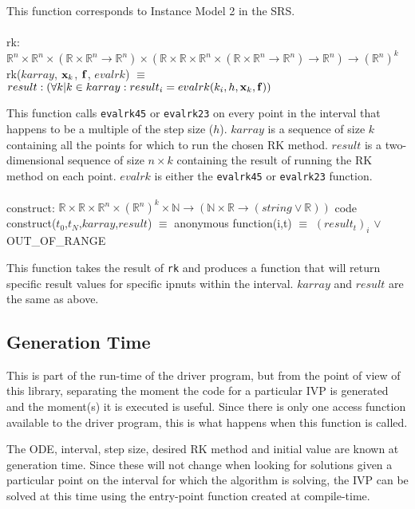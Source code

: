 \documentclass[12pt, titlepage]{article}
\begin{document}
This function corresponds to Instance Model 2 in the SRS.\\
\\
rk: $\mathbb{R}^n \times \mathbb{R}^n \times 
(\mathbb{R} \times \mathbb{R}^n \rightarrow \mathbb{R}^n) \times
(\mathbb{R} \times \mathbb{R} \times \mathbb{R}^n \times (\mathbb{R} 
\times \mathbb{R}^n \rightarrow \mathbb{R}^n) \rightarrow \mathbb{R}^n) 
\rightarrow (\mathbb{R}^n)^k$\\
rk($karray$, ${\bf x}_k$, ${\bf f}$, $evalrk$) $\equiv$ $result : (\forall k | 
k 
\in karray : result_i = evalrk (k_i,h, {\bf x}_k, {\bf f}))$

This function calls \lstinline[language=ML]|evalrk45| or 
\lstinline[language=ML]|evalrk23| on every point in the interval that happens 
to be a multiple of the step size ($h$). $karray$ is a sequence of size $k$ 
containing all the points for 
which to run the chosen RK method. $result$ is a two-dimensional 
sequence of size $n \times k$ containing the result of running the RK method on 
each point. $evalrk$ is either the \lstinline[language=ML]|evalrk45| or 
\lstinline[language=ML]|evalrk23| function.\\
\\
construct: $\mathbb{R} \times \mathbb{R} \times \mathbb{R}^n \times 
(\mathbb{R}^n)^k \times \mathbb{N} \rightarrow (\mathbb{N} \times \mathbb{R} 
\rightarrow (string \lor \mathbb{R}))$ code\\
construct($t_0$,$t_N$,$karray$,$result$) $\equiv$ anonymous function(i,t) 
$\equiv$ $(result_t)_i$ $\lor$ OUT\_OF\_RANGE

This function takes the result of \lstinline[language=ML]|rk| and produces a 
function that will return specific result values for specific ipnuts  within the 
interval. $karray$ and $result$ are the same as above.

\subsection{Generation Time}\label{ssec:generation-time}
This is part of the run-time of the driver program, but from the point of view 
of this library, separating the moment the code for a particular IVP is 
generated and the moment(s) it is executed is useful. Since there is only one 
access function available to the driver program, this is what happens when this 
function is called.

The ODE, interval, step size, desired RK method and initial value are known at 
generation time. 
Since these will not change when looking for solutions given a particular point 
on the interval for which the algorithm is solving, the IVP can be solved at 
this time using the entry-point function created at compile-time.
\end{document}

